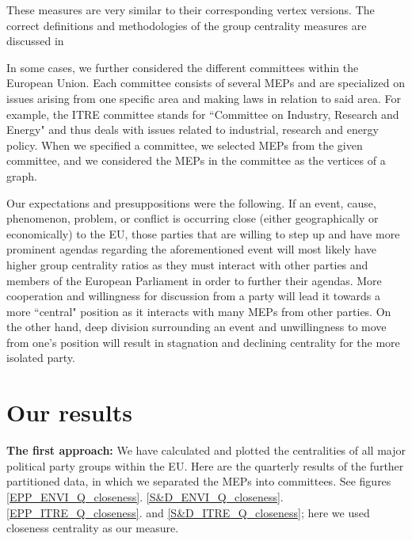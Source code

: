 \documentclass[lettersize,journal]{IEEEtran}
\begin{document}
These measures are very similar to their corresponding vertex versions. The correct definitions and methodologies of the group centrality measures are discussed in \cite{Centralities}

In some cases, we further considered the different committees within the European Union. Each committee consists of several MEPs and are specialized on issues arising from one specific area and making laws in relation to said area. For example, the ITRE committee stands for ``Committee on Industry, Research and Energy" and thus deals with issues related to industrial, research and energy policy. When we specified a committee, we selected MEPs from the given committee, and we considered the MEPs in the committee as the vertices of a graph.

Our expectations and presuppositions were the following. If an event, cause, phenomenon, problem, or conflict is occurring close (either geographically or economically) to the EU, those parties that are willing to step up and have more prominent agendas regarding the aforementioned event will most likely have higher group centrality ratios as they must interact with other parties and members of the European Parliament in order to further their agendas. More cooperation and willingness for discussion from a party will lead it towards a more ``central" position as it interacts with many MEPs from other parties. On the other hand, deep division surrounding an event and unwillingness to move from one's position will result in stagnation and declining centrality for the more isolated party.

\section{Our results} \label{sec:results}


\textbf{The first approach:} We have calculated and plotted the centralities of all major political party groups within the EU. Here are the quarterly results of the further partitioned data, in which we separated the MEPs into committees. See figures \ref{EPP_ENVI_Q_closeness}. \ref{S&D_ENVI_Q_closeness}. \ref{EPP_ITRE_Q_closeness}. and \ref{S&D_ITRE_Q_closeness}; here we used closeness centrality as our measure. 
\end{document}

